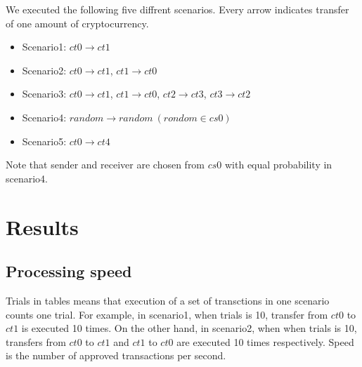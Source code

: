 \documentclass[a4paper, oneside]{discothesis}
\begin{document}
We executed the following five diffrent scenarios.
Every arrow indicates transfer of one amount of cryptocurrency.
\begin{itemize}
    \item Scenario1: $ct0 \rightarrow ct1$
    \item Scenario2: $ct0 \rightarrow ct1$, $ct1 \rightarrow ct0$
    \item Scenario3: $ct0 \rightarrow ct1$, $ct1 \rightarrow ct0$, $ct2 \rightarrow ct3$, $ct3 \rightarrow ct2$
    \item Scenario4: $random \rightarrow random~(rondom \in cs0)$
    \item Scenario5: $ct0 \rightarrow ct4$
\end{itemize}
Note that sender and receiver are chosen from $cs0$ with equal probability in scenario4.

\section{Results}

\subsection{Processing speed}
Trials in tables means that execution of a set of transctions in one scenario counts one trial.
For example, in scenario1, when trials is 10, transfer from $ct0$ to $ct1$ is executed 10 times.
On the other hand, in scenario2, when when trials is 10, transfers from $ct0$ to $ct1$
and $ct1$ to $ct0$ are executed 10 times respectively.
Speed is the number of approved transactions per second.
\end{document}
